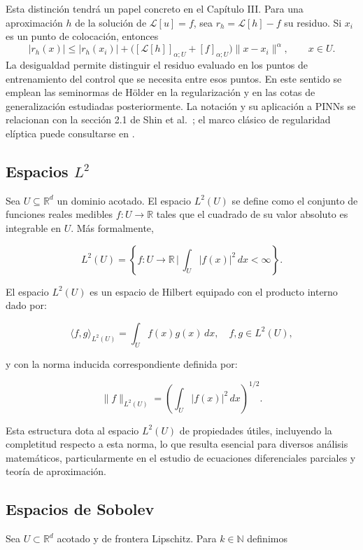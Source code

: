 Esta distinci\'on tendr\'a un papel concreto en el Cap\'itulo III. Para una
aproximaci\'on $h$ de la soluci\'on de $\mathcal L[u]=f$,
sea $r_h=\mathcal L[h]-f$ su residuo. Si $x_i$ es un punto de colocaci\'on,
entonces
\[
|r_h(x)|\leq |r_h(x_i)|+
\bigl([\mathcal L[h]]_{\alpha;U}+[f]_{\alpha;U}\bigr)
\|x-x_i\|^\alpha,
\qquad x\in U.
\]
La desigualdad permite distinguir el residuo evaluado en los puntos de
entrenamiento del control que se necesita entre esos puntos. En este
sentido se emplean las seminormas de H\"older en la regularizaci\'on y
en las cotas de generalizaci\'on estudiadas posteriormente.
La notaci\'on y su aplicaci\'on a PINNs se relacionan con la secci\'on 2.1
de Shin et al.~\cite{shin2020convergence}; el marco cl\'asico de regularidad
el\'iptica puede consultarse en \cite{gilbarg2001elliptic}.

\subsection*{Espacios \(L^2\)}

Sea \(U \subseteq \mathbb{R}^d\) un dominio acotado. El espacio \(L^2(U)\) se define como el conjunto de funciones reales medibles \(f: U \rightarrow \mathbb{R}\) tales que el cuadrado de su valor absoluto es integrable en \(U\). Más formalmente,

\[
L^2(U) = \left\{ f : U \rightarrow \mathbb{R} \,\Big|\, \int_U |f(x)|^2\,dx < \infty \right\}.
\]

El espacio \(L^2(U)\) es un espacio de Hilbert equipado con el producto interno dado por:

\[
\langle f,g \rangle_{L^2(U)} = \int_U f(x)g(x)\,dx, \quad f,g \in L^2(U),
\]

y con la norma inducida correspondiente definida por:

\[
\|f\|_{L^2(U)} = \left(\int_U |f(x)|^2\,dx\right)^{1/2}.
\]

Esta estructura dota al espacio \(L^2(U)\) de propiedades útiles, incluyendo la completitud respecto a esta norma, lo que resulta esencial para diversos análisis matemáticos, particularmente en el estudio de ecuaciones diferenciales parciales y teoría de aproximación.

\subsection*{Espacios de Sobolev}

Sea $U\subset\mathbb{R}^d$ acotado y de frontera Lipschitz. Para $k\in\mathbb{N}$ definimos

